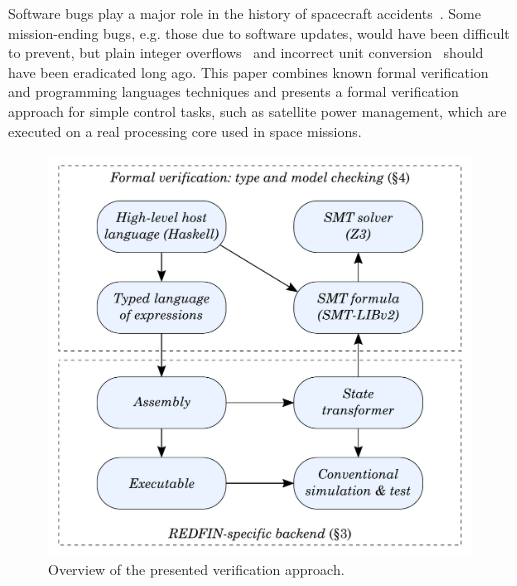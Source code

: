 Software bugs play a major role in the history of spacecraft
accidents~\cite{Leveson2004}. Some mission-ending bugs, e.g. those due to
software updates, would have been difficult to prevent, but plain integer
overflows~\cite{bug-rocket} and incorrect unit
conversion~\cite{NASA:1999:Mars} should have been eradicated long ago.
This paper
combines known formal verification and programming languages techniques and presents
a formal verification approach for simple control tasks, such as satellite power
management, which are executed on a real processing core used in space missions.



\begin{figure}
\centerline{\includegraphics[scale=0.42]{fig/overview.pdf}}
\vspace{-3.5mm}
\caption{Overview of the presented verification approach.\label{fig-overview}}
\vspace{-4.5mm}
\end{figure}

